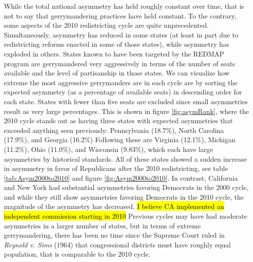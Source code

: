 \documentclass[preprint,12pt]{article}
\newcommand{\CM}[2][green]{ {\sethlcolor{#1} \hl{#2}} }
\begin{document}
While the total national asymmetry has held roughly constant over time, that is not to say that gerrymandering practices have held constant.
To the contrary, some aspects of the 2010 redistricting cycle are quite unprecedented.
Simultaneously, asymmetry has reduced in some states (at least in part due to redistricting reforms enacted in some of those states), while asymmetry has exploded in others.
States known to have been targeted by the REDMAP program are gerrymandered very aggressively in terms of the number of seats available and the level of partisanship in those states.
We can visualize how extreme the most aggressive gerrymanders are in each cycle are by sorting the expected asymmetry (as a percentage of available seats) in descending order for each state.
States with fewer than five seats are excluded since small asymmetries result as very large percentages.
This is shown in figure \ref{fig:asymRank}, where the 2010 cycle stands out as having three states with expected asymmetries that exceeded anything seen previously: Pennsylvania (18.7\%), North Carolina (17.9\%), and Georgia (16.2\%)
Following these are Virginia (12.1\%), Michigan (11.2\%), Ohio (11.0\%), and Wisconsin (9.83\%), which each have large asymmetries by historical standards.
All of these states showed a sudden increase in asymmetry in favor of Republicans after the 2010 redistricting, see table \ref{tab:Asym2000to2010} and figure \ref{fig:Asym2000to2010}. 
In contrast, California and New York had substantial asymmetries favoring Democrats in the 2000 cycle, and while they still show asymmetries favoring Democrats in the 2010 cycle, the magnitude of the asymmetry has decreased.
\CM{I believe CA implemented an independent commission starting in 2010}
Previous cycles may have had moderate asymmetries in a larger number of states, but in terms of extreme gerrymandering, there has been no time since the Supreme Court ruled in \emph{Reynold v. Sims} (1964) that congressional districts must have roughly equal population, that is comparable to the 2010 cycle.
\end{document}
